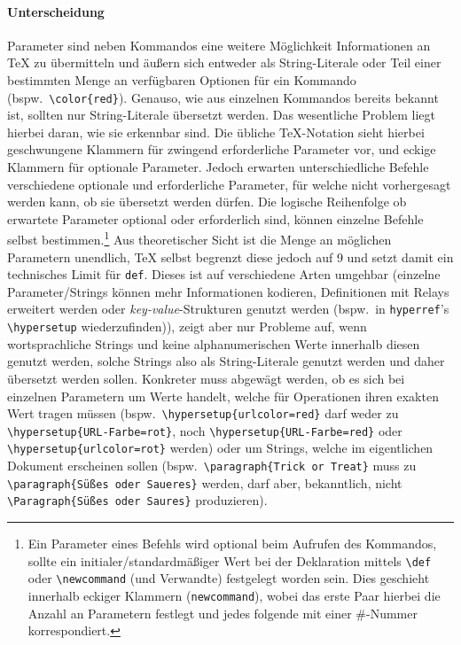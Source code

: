 \paragraph{Unterscheidung}\par
Parameter sind neben Kommandos eine weitere Möglichkeit Informationen an \TeX{} zu übermitteln und äußern sich entweder als String-Literale oder Teil einer bestimmten Menge an verfügbaren Optionen für ein Kommando (bspw.\ \verb|\color{red}|). Genauso, wie aus einzelnen Kommandos bereits bekannt ist, sollten nur String-Literale übersetzt werden. Das wesentliche Problem liegt hierbei daran, wie sie erkennbar sind. Die übliche \TeX{}-Notation sieht hierbei geschwungene Klammern für zwingend erforderliche Parameter vor, und eckige Klammern für optionale Parameter. Jedoch erwarten unterschiedliche Befehle verschiedene optionale und erforderliche Parameter, für welche nicht vorhergesagt werden kann, ob sie übersetzt werden dürfen. Die logische Reihenfolge ob erwartete Parameter optional oder erforderlich sind, können einzelne Befehle selbst bestimmen.\footnote{Ein Parameter eines Befehls wird optional beim Aufrufen des Kommandos, sollte ein initialer/standardmäßiger Wert bei der Deklaration mittels \verb"\def" oder \verb"\newcommand" (und Verwandte) festgelegt worden sein. Dies geschieht innerhalb eckiger Klammern (\texttt{newcommand}), wobei das erste Paar hierbei die Anzahl an Parametern festlegt und jedes folgende mit einer \#-Nummer korrespondiert.}
Aus theoretischer Sicht ist die Menge an möglichen Parametern unendlich, \TeX{} selbst begrenzt diese jedoch auf 9 und setzt damit ein technisches Limit für \texttt{def}. Dieses ist auf verschiedene Arten umgehbar (einzelne Parameter/Strings können mehr Informationen kodieren, Definitionen mit Relays erweitert werden oder \textit{key-value}-Strukturen genutzt werden (bspw.\ in \texttt{hyperref}'s \verb|\hypersetup| wiederzufinden)), zeigt aber nur Probleme auf, wenn wortsprachliche Strings und keine alphanumerischen Werte innerhalb diesen genutzt werden, solche Strings also als String-Literale genutzt werden und daher übersetzt werden sollen. %
Konkreter muss abgewägt werden, ob es sich bei einzelnen Parametern um Werte handelt, welche für Operationen ihren exakten Wert tragen müssen (bspw.\ \verb"\hypersetup{urlcolor=red}" darf weder zu \verb"\hypersetup{URL-Farbe=rot}", noch \verb"\hypersetup{URL-Farbe=red}" oder \verb"\hypersetup{urlcolor=rot}" werden) oder um Strings, welche im eigentlichen Dokument erscheinen sollen (bspw.\ \verb"\paragraph{Trick or Treat}" muss zu \verb"\paragraph{Süßes oder Saueres}" werden, darf aber, bekanntlich, nicht \verb"\Paragraph{Süßes oder Saures}" produzieren). 
